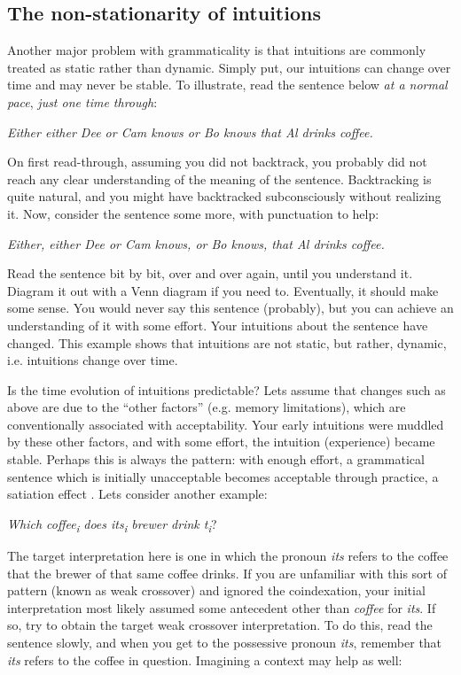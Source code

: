 \subsection{The non-stationarity of intuitions}

Another major problem with grammaticality is that intuitions are commonly treated as static rather than dynamic. Simply put, our intuitions can change over time and may never be stable. To illustrate, read the sentence below \textit{at a normal pace}, \textit{just one time through}:

    \textit{Either either Dee or Cam knows or Bo knows that Al drinks coffee.}

On first read-through, assuming you did not backtrack, you probably did not reach any clear understanding of the meaning of the sentence. Backtracking is quite natural, and you might have backtracked subconsciously without realizing it. Now, consider the sentence some more, with punctuation to help:

    \textit{Either, either Dee or Cam knows, or Bo knows, that Al drinks coffee.}

  Read the sentence bit by bit, over and over again, until you understand it. Diagram it out with a Venn diagram if you need to. Eventually, it should make some sense. You would never say this sentence (probably), but you can achieve an understanding of it with some effort. Your intuitions about the sentence have changed. This example shows that intuitions are not static, but rather, dynamic, i.e. intuitions change over time.

  Is the time evolution of intuitions predictable? Lets assume that changes such as above are due to the “other factors” (e.g. memory limitations), which are conventionally associated with acceptability. Your early intuitions were muddled by these other factors, and with some effort, the intuition (experience) became stable. Perhaps this is always the pattern: with enough effort, a grammatical sentence which is initially unacceptable becomes acceptable through practice, a satiation effect \citep{Snyder2000}. Lets consider another example:

    \textit{Which coffee\textsubscript{i} does its\textsubscript{i} brewer drink t\textsubscript{i}}?

  The target interpretation here is one in which the pronoun \textit{its} refers to the coffee that the brewer of that same coffee drinks. If you are unfamiliar with this sort of pattern (known as weak crossover) and ignored the coindexation, your initial interpretation most likely assumed some antecedent other than \textit{coffee} for \textit{its}. If so, try to obtain the target weak crossover interpretation. To do this, read the sentence slowly, and when you get to the possessive pronoun \textit{its}, remember that \textit{its} refers to the coffee in question. Imagining a context may help as well:

